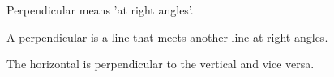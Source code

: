 Perpendicular means 'at right angles'. 
\par
A perpendicular is a line that meets another line at right angles. 

\par
The horizontal is perpendicular to the vertical and vice versa.